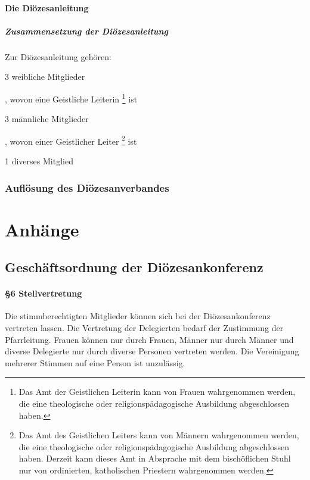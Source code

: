 \documentclass[12pt]{report}
\begin{document}
\begin{flushleft}
\subsection{Die Diözesanleitung}
\subsubsection{Zusammensetzung der Diözesanleitung}
Zur Diözesanleitung gehören:
\begin{itemize}
  {\color{red}\item 3 weibliche Mitglieder}, wovon eine Geistliche Leiterin 
       \footnote{
           Das Amt der Geistlichen Leiterin kann von Frauen wahrgenommen werden, die eine theologische
           oder religionspädagogische Ausbildung abgeschlossen haben.
       }
       ist
  {\color{red}\item 3 männliche Mitglieder}, wovon einer Geistlicher Leiter
        \footnote{
            Das Amt des Geistlichen Leiters kann von Männern wahrgenommen werden, die eine theologische
            oder religionspädagogische Ausbildung abgeschlossen haben. Derzeit kann dieses Amt in Absprache
            mit dem bischöflichen Stuhl nur von ordinierten, katholischen Priestern wahrgenommen werden.	
        }
        ist
    {\color{red}\item 1 diverses Mitglied}
\end{itemize}


\section{Auflösung des Diözesanverbandes}

\part*{Anhänge}

\chapter*{Geschäftsordnung der Diözesankonferenz}

\subsection*{§6 Stellvertretung}
Die stimmberechtigten Mitglieder können sich bei der Diözesankonferenz vertreten lassen. Die Vertretung
der Delegierten bedarf der Zustimmung der Pfarrleitung. Frauen können nur durch Frauen, Männer nur durch
Männer {\color{red} und diverse Delegierte nur durch diverse Personen} vertreten werden. Die Vereinigung mehrerer Stimmen auf eine Person ist unzulässig.

\end{flushleft}
\end{document}
